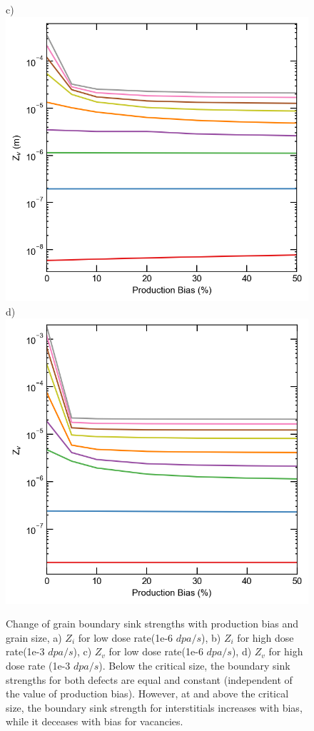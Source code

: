 \documentclass[utf8]{frontiersSCNS} %
\begin{document}
\begin{figure}[h!]
        c)\includegraphics[scale=0.5]{Fig10_c}
        d)\includegraphics[scale=0.5]{Fig10_d}
        \caption{Change of grain boundary sink strengths with production bias and grain size, a) $Z_i$ for low dose rate(1e-6 $dpa/s$), b) $Z_i$ for high dose rate(1e-3 $dpa/s$), c) $Z_v$ for low dose rate(1e-6 $dpa/s$), d) $Z_v$ for high dose rate (1e-3 $dpa/s$). Below the critical size, the boundary sink strengths for both defects are equal and constant (independent of the value of production bias). However, at and above the critical size, the boundary sink strength for interstitials increases with bias, while it deceases with bias for vacancies.}
        \label{figure:sink_strengths_neutron_bias_Z}
    \end{figure}
    
\end{document}
